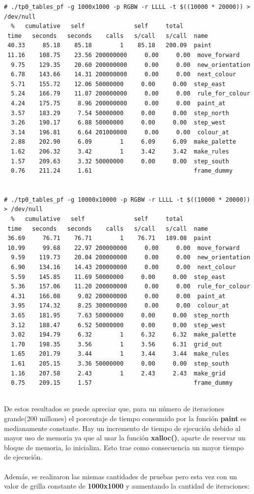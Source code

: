 \documentclass[a4paper, 10pt, twoside, notitlepage]{article}
\begin{document}
\begin{verbatim}
# ./tp0_tables_pf -g 1000x1000 -p RGBW -r LLLL -t $((10000 * 20000)) > /dev/null
  %   cumulative   self              self     total           
 time   seconds   seconds    calls   s/call   s/call  name    
 40.33     85.18    85.18        1    85.18   200.09  paint
 11.16    108.75    23.56 200000000     0.00     0.00  move_forward
  9.75    129.35    20.60 200000000     0.00     0.00  new_orientation
  6.78    143.66    14.31 200000000     0.00     0.00  next_colour
  5.71    155.72    12.06 50000000     0.00     0.00  step_east
  5.24    166.79    11.07 200000000     0.00     0.00  rule_for_colour
  4.24    175.75     8.96 200000000     0.00     0.00  paint_at
  3.57    183.29     7.54 50000000     0.00     0.00  step_north
  3.26    190.17     6.88 50000000     0.00     0.00  step_west
  3.14    196.81     6.64 201000000     0.00     0.00  colour_at
  2.88    202.90     6.09        1     6.09     6.09  make_palette
  1.62    206.32     3.42        1     3.42     3.42  make_rules
  1.57    209.63     3.32 50000000     0.00     0.00  step_south
  0.76    211.24     1.61                             frame_dummy


# ./tp0_tables_pf -g 10000x10000 -p RGBW -r LLLL -t $((10000 * 20000)) > /dev/null
  %   cumulative   self              self     total           
 time   seconds   seconds    calls   s/call   s/call  name    
 36.69     76.71    76.71        1    76.71   189.08  paint
 10.99     99.68    22.97 200000000     0.00     0.00  move_forward
  9.59    119.73    20.04 200000000     0.00     0.00  new_orientation
  6.90    134.16    14.43 200000000     0.00     0.00  next_colour
  5.59    145.85    11.69 50000000     0.00     0.00  step_east
  5.36    157.06    11.20 200000000     0.00     0.00  rule_for_colour
  4.31    166.08     9.02 200000000     0.00     0.00  paint_at
  3.95    174.32     8.25 300000000     0.00     0.00  colour_at
  3.65    181.95     7.63 50000000     0.00     0.00  step_north
  3.12    188.47     6.52 50000000     0.00     0.00  step_west
  3.02    194.79     6.32        1     6.32     6.32  make_palette
  1.70    198.35     3.56        1     3.56     6.31  grid_out
  1.65    201.79     3.44        1     3.44     3.44  make_rules
  1.61    205.15     3.36 50000000     0.00     0.00  step_south
  1.16    207.58     2.43        1     2.43     2.43  make_grid
  0.75    209.15     1.57                             frame_dummy


\end{verbatim}
\normalsize
De estos resultados se puede apreciar que, para un número de iteraciones grande(200 millones) el porcentaje de tiempo consumido por la función \textbf{paint} es medianamente constante. Hay un incremento de tiempo de ejecución debido al mayor uso de memoria ya que al usar la función \textbf{xalloc()}, aparte de reservar un bloque de memoria, lo inicializa. Esto trae como consecuencia un mayor tiempo de ejecución.\\
\\
Además, se realizaron las mismas cantidades de pruebas pero esta vez con un valor de grilla constante de \textbf{1000x1000} y aumentando la cantidad de iteraciones:
\end{document}
